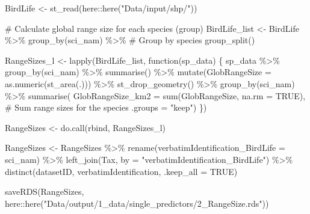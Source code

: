 \documentclass[
  letterpaper,
  DIV=11,
  numbers=noendperiod]{scrreprt}
\newenvironment{Shaded}{\begin{snugshade}}{\end{snugshade}}
\newcommand{\AttributeTok}[1]{\textcolor[rgb]{0.40,0.45,0.13}{#1}}
\newcommand{\CommentTok}[1]{\textcolor[rgb]{0.37,0.37,0.37}{#1}}
\newcommand{\ConstantTok}[1]{\textcolor[rgb]{0.56,0.35,0.01}{#1}}
\newcommand{\ControlFlowTok}[1]{\textcolor[rgb]{0.00,0.23,0.31}{#1}}
\newcommand{\FunctionTok}[1]{\textcolor[rgb]{0.28,0.35,0.67}{#1}}
\newcommand{\NormalTok}[1]{\textcolor[rgb]{0.00,0.23,0.31}{#1}}
\newcommand{\OtherTok}[1]{\textcolor[rgb]{0.00,0.23,0.31}{#1}}
\newcommand{\SpecialCharTok}[1]{\textcolor[rgb]{0.37,0.37,0.37}{#1}}
\newcommand{\StringTok}[1]{\textcolor[rgb]{0.13,0.47,0.30}{#1}}
\begin{document}
\begin{Shaded}
\begin{Highlighting}[]
\NormalTok{BirdLife }\OtherTok{\textless{}{-}} \FunctionTok{st\_read}\NormalTok{(here}\SpecialCharTok{::}\FunctionTok{here}\NormalTok{(}\StringTok{"Data/input/shp/"}\NormalTok{))}

\CommentTok{\# Calculate global range size for each species (group)}
\NormalTok{BirdLife\_list }\OtherTok{\textless{}{-}}\NormalTok{ BirdLife }\SpecialCharTok{\%\textgreater{}\%}
  \FunctionTok{group\_by}\NormalTok{(sci\_nam) }\SpecialCharTok{\%\textgreater{}\%}   \CommentTok{\# Group by species}
  \FunctionTok{group\_split}\NormalTok{()}

\NormalTok{RangeSizes\_l }\OtherTok{\textless{}{-}} \FunctionTok{lapply}\NormalTok{(BirdLife\_list, }\ControlFlowTok{function}\NormalTok{(sp\_data) \{}
\NormalTok{  sp\_data }\SpecialCharTok{\%\textgreater{}\%}
    \FunctionTok{group\_by}\NormalTok{(sci\_nam) }\SpecialCharTok{\%\textgreater{}\%}
    \FunctionTok{summarise}\NormalTok{() }\SpecialCharTok{\%\textgreater{}\%}
    \FunctionTok{mutate}\NormalTok{(}\AttributeTok{GlobRangeSize =} \FunctionTok{as.numeric}\NormalTok{(}\FunctionTok{st\_area}\NormalTok{(.))) }\SpecialCharTok{\%\textgreater{}\%}
    \FunctionTok{st\_drop\_geometry}\NormalTok{() }\SpecialCharTok{\%\textgreater{}\%}
    \FunctionTok{group\_by}\NormalTok{(sci\_nam) }\SpecialCharTok{\%\textgreater{}\%}
    \FunctionTok{summarise}\NormalTok{(}
      \AttributeTok{GlobRangeSize\_km2 =} \FunctionTok{sum}\NormalTok{(GlobRangeSize, }\AttributeTok{na.rm =} \ConstantTok{TRUE}\NormalTok{),  }\CommentTok{\# Sum range sizes for the species}
      \AttributeTok{.groups =} \StringTok{"keep"}\NormalTok{) }
\NormalTok{\})}


\NormalTok{RangeSizes }\OtherTok{\textless{}{-}} \FunctionTok{do.call}\NormalTok{(rbind, RangeSizes\_l)}

\NormalTok{RangeSizes }\OtherTok{\textless{}{-}}\NormalTok{ RangeSizes }\SpecialCharTok{\%\textgreater{}\%}
  \FunctionTok{rename}\NormalTok{(}\AttributeTok{verbatimIdentification\_BirdLife =}\NormalTok{ sci\_nam) }\SpecialCharTok{\%\textgreater{}\%}
  \FunctionTok{left\_join}\NormalTok{(Tax, }\AttributeTok{by =} \StringTok{"verbatimIdentification\_BirdLife"}\NormalTok{) }\SpecialCharTok{\%\textgreater{}\%}
  \FunctionTok{distinct}\NormalTok{(datasetID, verbatimIdentification, }\AttributeTok{.keep\_all =} \ConstantTok{TRUE}\NormalTok{)}

\FunctionTok{saveRDS}\NormalTok{(RangeSizes, here}\SpecialCharTok{::}\FunctionTok{here}\NormalTok{(}\StringTok{"Data/output/1\_data/single\_predictors/2\_RangeSize.rds"}\NormalTok{))}


\end{Highlighting}
\end{Shaded}
\end{document}
